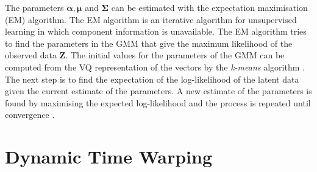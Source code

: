 The parameters $\boldsymbol{\alpha}, \boldsymbol{\mu}$ and $ \mathbf{\Sigma}$ can be estimated with the expectation maximisation (EM) algorithm. The EM algorithm is an iterative algorithm for unsupervised learning in which component information is unavailable. The EM algorithm tries to find the parameters in the GMM that give the maximum likelihood of the observed data $\mathbf{Z}$. The initial values for the parameters of the GMM can be computed from the VQ representation of the vectors by the \emph{k-means} algorithm \cite{linde80}. The next step is to find the expectation of the log-likelihood of the latent data given the current estimate of the parameters. A new estimate of the parameters is found by maximising the expected log-likelihood and the process is repeated until convergence \cite{taletek}.



\section{Dynamic Time Warping} %
\label{sec:dynamic_time_warping}
\newcommand{\ttt}{\mathcal T}
\newcommand{\auto}{R}
\newcommand{\Auto}{\boldsymbol R}

